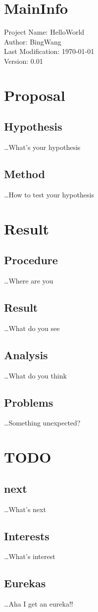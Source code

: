 \documentclass[a4paper,11pt]{article}
\begin{document}
\section{MainInfo}
Project Name: HelloWorld \\
Author: BingWang \\
Last Modification: \today\\
Version: 0.01\\
\section{Proposal}
\subsection{Hypothesis}
\ldots What's your hypothesis
\subsection{Method}
\ldots How to test your hypothesis
\section{Result}
\subsection{Procedure}
\ldots Where are you
\subsection{Result}
\ldots What do you see
\subsection{Analysis}
\ldots What do you think
\subsection{Problems}
\ldots Something unexpected?
\section{TODO}
\subsection{next}
\ldots What's next 
\subsection{Interests}
\ldots What's interest
\subsection{Eurekas}
\ldots Aha I get an eureka!!
\end{document}
